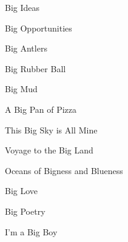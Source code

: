 \begin{poem}{Big Ideas}{}

\end{poem}

\begin{poem}{Big Opportunities}{}

\end{poem}

\begin{poem}{Big Antlers}{}

\end{poem}

\begin{poem}{Big Rubber Ball}{}

\end{poem}

\begin{poem}{Big Mud}{}

\end{poem}

\begin{poem}{A Big Pan of Pizza}{}

\end{poem}

\begin{poem}{This Big Sky is All Mine}{}

\end{poem}

\begin{poem}{Voyage to the Big Land}{}

\end{poem}

\begin{poem}{Oceans of Bigness and Blueness}{}

\end{poem}

\begin{poem}{Big Love}{}

\end{poem}

\begin{poem}{Big Poetry}{}

\end{poem}

\begin{poem}{I'm a Big Boy}{}

\end{poem}
